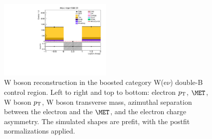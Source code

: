\begin{figure}[tbp]
\begin{center}
    \includegraphics[width=0.48\textwidth]{figures/wlnhbb2016/boosted/WenWHTT2bFJCR_lepton1Charge.pdf}
    \caption{W boson reconstruction in the boosted category W(e$\nu$) double-B control region.
    Left to right and top to bottom: electron $p_{\mathrm{T}}$, $\MET$, W boson $p_{\mathrm{T}}$, W boson transverse mass,
    azimuthal separation between the electron and the $\MET$, and the electron charge asymmetry.
    The simulated shapes are prefit, with the postfit normalizations applied.}
    \label{fig:boost_WenTT2b_WBosons}
  \end{center}
\end{figure}
\clearpage

